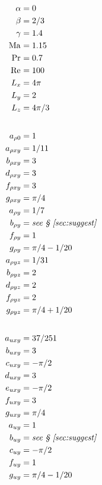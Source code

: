 \documentclass[10pt,reqno]{amsart}
\newcommand{\Mach}[1][]{\ensuremath{\mbox{Ma}_{#1}}}
\newcommand{\Reynolds}[1][]{\ensuremath{\mbox{Re}_{#1}}}
\newcommand{\Prandtl}[1][]{\ensuremath{\mbox{Pr}_{#1}}}
\begin{document}
\begin{table}[p]
\allowdisplaybreaks
\begin{multicols}{3}
\begin{small}
\begin{align*}
\alpha    &= 0          \\
\beta     &= 2/3        \\
\gamma    &= \num{1.4}  \\
\Mach     &= \num{1.15} \\
\Prandtl  &= \num{0.7}  \\
\Reynolds &= 100 \\
L_x       &= 4 \pi \\
L_y       &= 2 \\
L_z       &= 4 \pi / 3 \\
\intertext{}
a_{\rho{}0}  &= 1 \\
a_{\rho{}xy} &= 1 / 11 \\
b_{\rho{}xy} &= 3 \\
d_{\rho{}xy} &= 3 \\
f_{\rho{}xy} &= 3 \\
g_{\rho{}xy} &= \pi / 4 \\
a_{\rho{}y} &= 1 / 7 \\
b_{\rho{}y} &= \text{\emph{see \textsection{}~\ref{sec:suggest}}} \\
f_{\rho{}y} &= 1 \\
g_{\rho{}y} &= \pi / 4 - 1 / 20 \\
a_{\rho{}yz} &= 1 / 31 \\
b_{\rho{}yz} &= 2 \\
d_{\rho{}yz} &= 2 \\
f_{\rho{}yz} &= 2 \\
g_{\rho{}yz} &= \pi / 4 + 1 / 20 \\
\intertext{}
a_{uxy} &= 37 / 251 \\
b_{uxy} &= 3 \\
c_{uxy} &= - \pi / 2 \\
d_{uxy} &= 3 \\
e_{uxy} &= - \pi / 2 \\
f_{uxy} &= 3 \\
g_{uxy} &= \pi / 4 \\
a_{uy} &= 1 \\
b_{uy} &= \text{\emph{see \textsection{}~\ref{sec:suggest}}} \\
c_{uy} &= -\pi / 2 \\
f_{uy} &= 1 \\
g_{uy} &= \pi / 4 - 1 / 20 \\

\end{align*}
\end{small}
\end{multicols}
\end{table}
\end{document}
